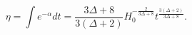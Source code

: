 \begin{equation}
\eta = \int e^{-\alpha} dt
= \frac{3 \Delta + 8}{3 (\Delta + 2)} H_{0}^{-\frac{2}{3 \Delta + 8}} 
t^{\frac{3 (\Delta + 2)}{3 \Delta + 8}}.
\end{equation}

